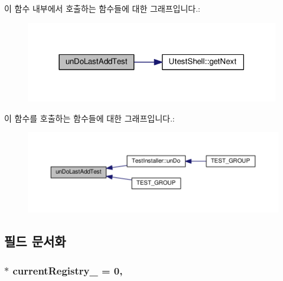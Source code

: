 이 함수 내부에서 호출하는 함수들에 대한 그래프입니다.\+:
\nopagebreak
\begin{figure}[H]
\begin{center}
\leavevmode
\includegraphics[width=314pt]{class_test_registry_ac2a1c4ff626d3a17ce2770d730fb6764_cgraph}
\end{center}
\end{figure}




이 함수를 호출하는 함수들에 대한 그래프입니다.\+:
\nopagebreak
\begin{figure}[H]
\begin{center}
\leavevmode
\includegraphics[width=350pt]{class_test_registry_ac2a1c4ff626d3a17ce2770d730fb6764_icgraph}
\end{center}
\end{figure}




\subsection{필드 문서화}
\subsubsection[{\texorpdfstring{current\+Registry\+\_\+}{currentRegistry_}}]{ $\ast$ current\+Registry\+\_\+ = 0\hspace{0.3cm}{\ttfamily [static]}, {\ttfamily [private]}}\hypertarget{class_test_registry_aaf0cd2582cd35230daa8a5d15823f840}{}\label{class_test_registry_aaf0cd2582cd35230daa8a5d15823f840}



